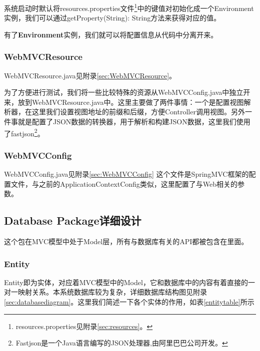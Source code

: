 系统启动时默认将resources.properties文件\footnote{resources.properties见附录\ref{sec:resources}。}中的键值对初始化成一个Environment实例，我们可以通过getProperty(String): String方法来获得对应的值。

有了\textbf{Environment}实例，我们就可以将配置信息从代码中分离开来。

\subsubsection{WebMVCResource}
WebMVCResource.java见附录\ref{sec:WebMVCResource}。

为了方便进行测试，我们将一些比较特殊的资源从WebMVCConfig.java中独立开来，放到WebMVCResource.java中。这里主要做了两件事情：一个是配置视图解析器，在这里我们设置视图地址的前缀和后缀，方便Controller调用视图。另外一件事就是配置了JSON数据的转换器，用于解析和构建JSON数据，这里我们使用了fastjson\footnote{Fastjson是一个Java语言编写的JSON处理器,由阿里巴巴公司开发。}。

\subsubsection{WebMVCConfig}
WebMVCConfig.java见附录\ref{sec:WebMVCConfig}
这个文件是SpringMVC框架的配置文件，与之前的ApplicationContextConfig类似，这里配置了与Web相关的参数。

\subsection{Database Package详细设计}

这个包在MVC模型中处于Model层，所有与数据库有关的API都被包含在里面。

\subsubsection{Entity}

Entity即为实体，对应着MVC模型中的Model，它和数据库中的内容有着直接的一对一映射关系。本系统数据库较为复杂，详细数据库结构图见附录\ref{sec:databasediagram}。这里我们简述一下各个实体的作用，如表\ref{entitytable}所示

